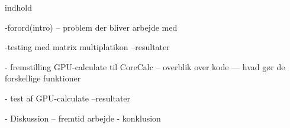 indhold

-forord(intro)
-- problem der bliver arbejde med

-testing med matrix multiplatikon
--resultater

- fremstilling GPU-calculate til CoreCalc
-- overblik over kode
--- hvad gør de forskellige funktioner

- test af GPU-calculate
--resultater

- Diskussion
-- fremtid arbejde
- konklusion





